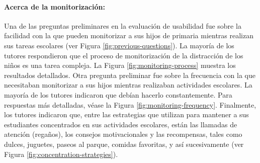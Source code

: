 \documentclass[a4paper,fleqn]{cas-sc}
\begin{document}
					\paragraph{\textbf{Acerca de la monitorización:}}
						Una de las preguntas preliminares en la evaluación de usabilidad fue sobre la facilidad con la que pueden monitorizar a sus hijos de primaria mientras realizan sus tareas escolares (ver Figura \ref{fig:previous-questions}). La mayoría de los tutores respondieron que el proceso de monitorización de la distracción de los niños es una tarea compleja. La Figura \ref{fig:monitoring-process} muestra los resultados detallados. Otra pregunta preliminar fue sobre la frecuencia con la que necesitaban monitorizar a sus hijos mientras realizaban actividades escolares. La mayoría de los tutores indicaron que debían hacerlo constantemente. Para respuestas más detalladas, véase la Figura \ref{fig:monitoring-frequency}. Finalmente, los tutores indicaron que, entre las estrategias que utilizan para mantener a sus estudiantes concentrados en sus actividades escolares, están las llamadas de atención (regaños), los consejos motivacionales y las recompensas, tales como dulces, juguetes, paseos al parque, comidas favoritas, y así sucesivamente (ver Figura \ref{fig:concentration-strategies}).
					
\end{document}
